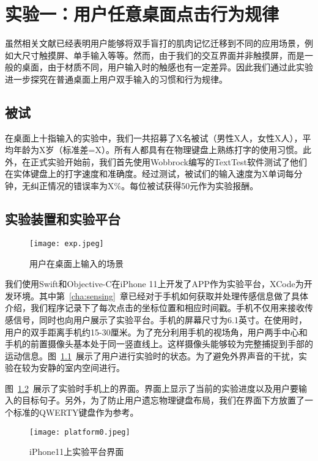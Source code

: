 \chapter{实验一：用户任意桌面点击行为规律}
\label{cha:exp1}
虽然相关文献已经表明用户能够将双手盲打的肌肉记忆迁移到不同的应用场景，例如大尺寸触摸屏、单手输入等等。然而，由于我们的交互界面并非触摸屏，而是一般的桌面，由于材质不同，用户输入时的触感也有一定差异。因此我们通过此实验进一步探究在普通桌面上用户双手输入的习惯和行为规律。


\section{被试}
在桌面上十指输入的实验中，我们一共招募了X名被试（男性X人，女性X人），平均年龄为X岁（标准差=X）。所有人都具有在物理键盘上熟练打字的使用习惯。此外，在正式实验开始前，我们首先使用Wobbrock编写的TextTest软件\cite{texttest}\cite{wobbrock2006analyzing}测试了他们在实体键盘上的打字速度和准确度。经过测试，被试们的输入速度为X单词每分钟，无纠正情况的错误率为X\%。每位被试获得50元作为实验报酬。

\section{实验装置和实验平台}
\begin{figure}[h] %
    \centering
    \texttt{[image: exp.jpeg]}
    \caption{用户在桌面上输入的场景}
    \label{fig:exp}
\end{figure}
我们使用Swift和Objective-C在iPhone 11上开发了APP作为实验平台，XCode为开发环境。其中第~\ref{cha:sensing}~章已经对于手机如何获取并处理传感信息做了具体介绍，我们程序记录下了每次点击的坐标位置和相应时间戳。手机不仅用来接收传感信号，同时也向用户展示了实验平台。手机的屏幕尺寸为6.1英寸。在使用时，用户的双手距离手机约15-30厘米。为了充分利用手机的视场角，用户两手中心和手机的前置摄像头基本处于同一竖直线上。这样摄像头能够较为完整捕捉到手部的运动信息。图~\ref{fig:exp}~展示了用户进行实验时的状态。为了避免外界声音的干扰，实验在较为安静的室内空间进行。

图~\ref{fig:platform0}~展示了实验时手机上的界面。界面上显示了当前的实验进度以及用户要输入的目标句子。另外，为了防止用户遗忘物理键盘布局，我们在界面下方放置了一个标准的QWERTY键盘作为参考。

\begin{figure}[h] %
    \centering
    \texttt{[image: platform0.jpeg]}
    \caption{iPhone11上实验平台界面}
    \label{fig:platform0}
\end{figure}

